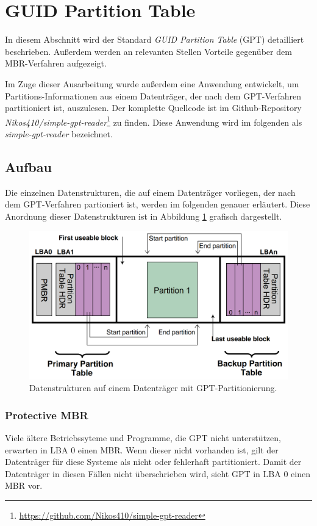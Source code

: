\section{GUID Partition Table}
\label{sec:gpt}
In diesem Abschnitt wird der Standard \textit{GUID Partition Table} (GPT) detailliert beschrieben.
Außerdem werden an relevanten Stellen Vorteile gegenüber dem MBR-Verfahren aufgezeigt.

Im Zuge dieser Ausarbeitung wurde außerdem eine Anwendung entwickelt, um Partitions-Informationen aus einem Datenträger, der nach dem GPT-Verfahren partitioniert ist, auszulesen.
Der komplette Quellcode ist im Github-Repository \textit{Nikos410/simple-gpt-reader}\footnote{\url{https://github.com/Nikos410/simple-gpt-reader}} zu finden.
Diese Anwendung wird im folgenden als \textit{simple-gpt-reader} bezeichnet.


\subsection{Aufbau}
\label{sec:gpt:structure}

Die einzelnen Datenstrukturen, die auf einem Datenträger vorliegen, der nach dem GPT-Verfahren partioniert ist, werden im folgenden genauer erläutert.
Diese Anordnung dieser Datenstrukturen ist in Abbildung \ref{fig:gpt_layout} grafisch dargestellt.

\begin{figure}[ht]
    \includegraphics[width=\textwidth]{content/graphics/GPT_Layout.png}
    \caption{Datenstrukturen auf einem Datenträger mit GPT-Partitionierung. \cite{uefi-spec}}
    \label{fig:gpt_layout}
\end{figure}

\subsubsection{Protective MBR}
Viele ältere Betriebssyteme und Programme, die GPT nicht unterstützen, erwarten in LBA 0 einen MBR.
Wenn dieser nicht vorhanden ist, gilt der Datenträger für diese Systeme als nicht oder fehlerhaft partitioniert.
Damit der Datenträger in diesen Fällen nicht überschrieben wird, sieht GPT in LBA 0 einen MBR vor.


